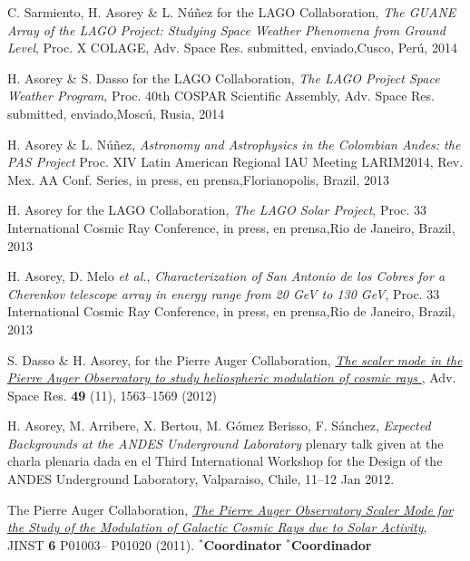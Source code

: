 \begin{etaremune}
\item {}C. Sarmiento, H. Asorey \& L. Núñez for the LAGO Collaboration, {\emph{The GUANE Array of the LAGO Project: Studying Space Weather Phenomena from Ground Level}}, \en Proc. X COLAGE, Adv. Space Res. \ifeng submitted, \else enviado,\fi  Cusco, Perú, 2014

\item {}H. Asorey \& S. Dasso for the LAGO Collaboration, {\emph{The LAGO Project Space Weather Program}}, \en Proc. 40th COSPAR Scientific Assembly, Adv. Space Res. \ifeng submitted, \else enviado,\fi  Moscú, Rusia, 2014

\item {}H. Asorey \& L. Núñez, {\emph{Astronomy and Astrophysics in the Colombian Andes: the PAS Project}} \en Proc. XIV Latin American Regional IAU Meeting LARIM2014, Rev. Mex. AA Conf. Series, \ifeng in press, \else en prensa,\fi  Florianopolis, Brazil, 2013

\item {}H. Asorey for the LAGO Collaboration, {\emph{The LAGO Solar Project}}, \en Proc. 33 International Cosmic Ray Conference, \ifeng in press, \else en prensa,\fi  Rio de Janeiro, Brazil, 2013

\item {}H. Asorey, D. Melo {\emph{et al.}}, {\emph{Characterization of San Antonio de los Cobres for a Cherenkov telescope array in energy range from 20 GeV to 130 GeV}}, \en Proc. 33 International Cosmic Ray Conference, \ifeng in press, \else en prensa,\fi  Rio de Janeiro, Brazil, 2013

\item {}S. Dasso \& H. Asorey, for the Pierre Auger Collaboration,
\href{http://dx.doi.org/10.1016/j.asr.2011.12.028}{\emph{ The scaler mode in
the Pierre Auger Observatory to study heliospheric modulation of cosmic rays
}}, Adv. Space Res. {\bf{49}} (11), 1563--1569 (2012)

\item {} H. Asorey, M. Arribere, X. Bertou, M. Gómez Berisso, F. Sánchez,
{\emph{Expected Backgrounds at the ANDES Underground Laboratory}}
\ifeng
plenary talk given at the
\else 
charla plenaria dada en el
\fi
Third International Workshop for the Design of the ANDES Underground Laboratory, Valparaiso, Chile, 11--12 Jan 2012.

\item {}The Pierre Auger Collaboration,
\href{http://dx.doi.org/10.1088/1748-0221/6/01/P01003}{\emph{The Pierre Auger
Observatory Scaler Mode for the Study of the Modulation of Galactic Cosmic Rays
due to Solar Activity}}, JINST {\bf 6} P01003--
P01020 (2011).
\ifeng $^*${\bf{Coordinator}} \else $^*${\bf{Coordinador}} \fi


\end{etaremune}

